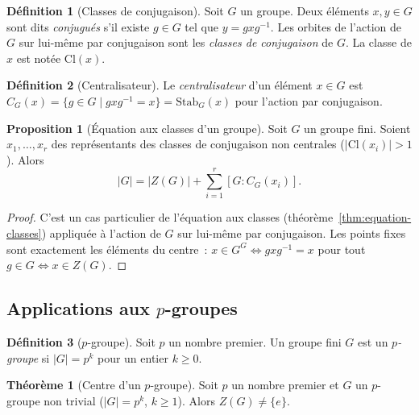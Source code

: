 \documentclass[12pt,a4paper,openany]{book}
\theoremstyle{definition}
\newtheorem{definition}{Définition}[chapter]
\newtheorem{theoreme}{Théorème}[chapter]
\newtheorem{proposition}{Proposition}[chapter]
\begin{document}
\begin{definition}[Classes de conjugaison]\label{def:classe-conjugaison}
  Soit $G$ un groupe. Deux éléments $x,y\in G$ sont dits
  \emph{conjugués} s'il existe $g\in G$
  tel que $y=gxg^{-1}$. Les orbites de l'action de $G$ sur lui-même
  par conjugaison sont les \emph{classes de conjugaison} de $G$.
  La classe de $x$ est notée $\mathrm{Cl}(x)$.
\end{definition}

\begin{definition}[Centralisateur]\label{def:centralisateur}
  Le \emph{centralisateur} d'un élément $x\in G$
  est $C_G(x) = \{g\in G\mid gxg^{-1}=x\} = \mathrm{Stab}_G(x)$
  pour l'action par conjugaison.
\end{definition}

\begin{proposition}[Équation aux classes d'un groupe]\label{prop:equation-classes-groupe}
  Soit $G$ un groupe fini. Soient $x_1,\ldots,x_r$ des représentants
  des classes de conjugaison non centrales ($|\mathrm{Cl}(x_i)|>1$).
  Alors
  \[
    |G| = |Z(G)| + \sum_{i=1}^{r} [G:C_G(x_i)].
  \]
\end{proposition}

\begin{proof}
  C'est un cas particulier de l'équation aux classes
  (théorème~\ref{thm:equation-classes}) appliquée à l'action de $G$ sur
  lui-même par conjugaison. Les points fixes sont exactement les
  éléments du centre~: $x\in G^G \iff gxg^{-1}=x$ pour tout
  $g\in G \iff x\in Z(G)$.
\end{proof}

\subsection{Applications aux $p$-groupes}\label{subsec:p-groupes}

\begin{definition}[$p$-groupe]\label{def:p-groupe}
  Soit $p$ un nombre premier. Un groupe fini $G$ est un
  \emph{$p$-groupe} si $|G|=p^k$ pour un
  entier $k\geq 0$.
\end{definition}

\begin{theoreme}[Centre d'un $p$-groupe]\label{thm:centre-p-groupe}
  Soit $p$ un nombre premier et $G$ un $p$-groupe non trivial
  ($|G|=p^k$, $k\geq 1$). Alors $Z(G)\neq\{e\}$.
\end{theoreme}
\end{document}

